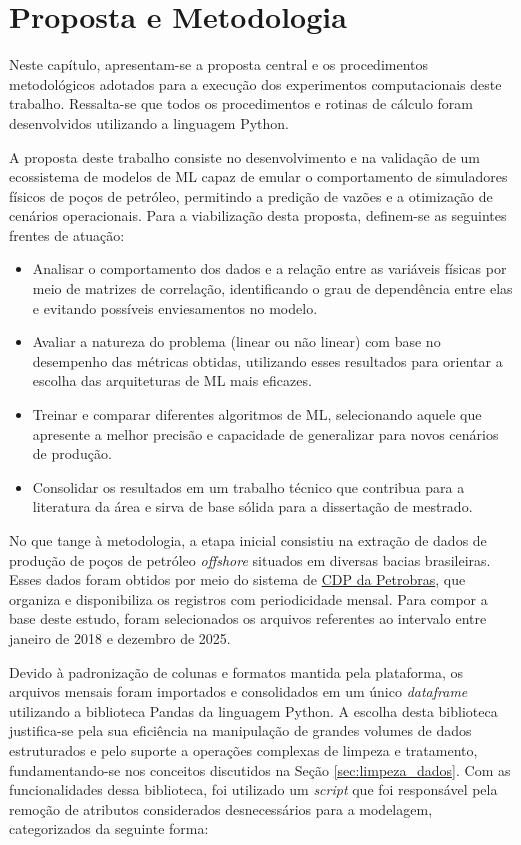 \chapter{Proposta e Metodologia}
\label{cap:proposta-e-metodologia}

Neste capítulo, apresentam-se a proposta central e os procedimentos metodológicos adotados para a execução dos experimentos computacionais deste trabalho. Ressalta-se que todos os procedimentos e rotinas de cálculo foram desenvolvidos utilizando a linguagem Python.

A proposta deste trabalho consiste no desenvolvimento e na validação de um ecossistema de modelos de \gls{ML} capaz de emular o comportamento de simuladores físicos de poços de petróleo, permitindo a predição de vazões e a otimização de cenários operacionais. Para a viabilização desta proposta, definem-se as seguintes frentes de atuação:

\begin{itemize}
    \item Analisar o comportamento dos dados e a relação entre as variáveis físicas por meio de matrizes de correlação, identificando o grau de dependência entre elas e evitando possíveis enviesamentos no modelo.
    \item Avaliar a natureza do problema (linear ou não linear) com base no desempenho das métricas obtidas, utilizando esses resultados para orientar a escolha das arquiteturas de \gls{ML} mais eficazes.
    \item Treinar e comparar diferentes algoritmos de \gls{ML}, selecionando aquele que apresente a melhor precisão e capacidade de generalizar para novos cenários de produção.
    \item Consolidar os resultados em um trabalho técnico que contribua para a literatura da área e sirva de base sólida para a dissertação de mestrado.
\end{itemize}

No que tange à metodologia, a etapa inicial consistiu na extração de dados de produção de poços de petróleo \textit{offshore} situados em diversas bacias brasileiras. Esses dados foram obtidos por meio do sistema de \href{https://cdp.anp.gov.br/ords/r/cdp_apex/consulta-dados-publicos-cdp/principal}{\gls{CDP} da Petrobras}, que organiza e disponibiliza os registros com periodicidade mensal. Para compor a base deste estudo, foram selecionados os arquivos referentes ao intervalo entre janeiro de 2018 e dezembro de 2025.

Devido à padronização de colunas e formatos mantida pela plataforma, os arquivos mensais foram importados e consolidados em um único \textit{dataframe} utilizando a biblioteca Pandas da linguagem Python. A escolha desta biblioteca justifica-se pela sua eficiência na manipulação de grandes volumes de dados estruturados e pelo suporte a operações complexas de limpeza e tratamento, fundamentando-se nos conceitos discutidos na Seção \ref{sec:limpeza_dados}. Com as funcionalidades dessa biblioteca, foi utilizado um \textit{script} que foi responsável pela remoção de atributos considerados desnecessários para a modelagem, categorizados da seguinte forma:

